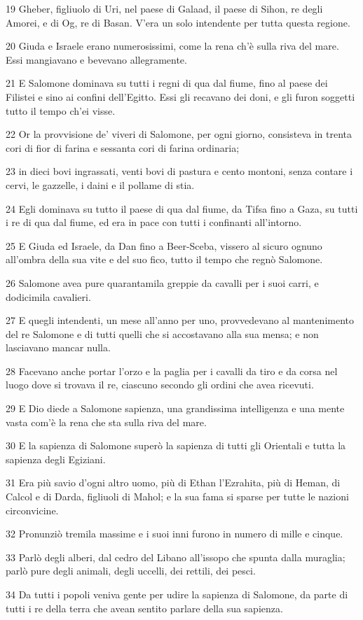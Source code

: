 \par 19 Gheber, figliuolo di Uri, nel paese di Galaad, il paese di Sihon, re degli Amorei, e di Og, re di Basan. V'era un solo intendente per tutta questa regione.
\par 20 Giuda e Israele erano numerosissimi, come la rena ch'è sulla riva del mare. Essi mangiavano e bevevano allegramente.
\par 21 E Salomone dominava su tutti i regni di qua dal fiume, fino al paese dei Filistei e sino ai confini dell'Egitto. Essi gli recavano dei doni, e gli furon soggetti tutto il tempo ch'ei visse.
\par 22 Or la provvisione de' viveri di Salomone, per ogni giorno, consisteva in trenta cori di fior di farina e sessanta cori di farina ordinaria;
\par 23 in dieci bovi ingrassati, venti bovi di pastura e cento montoni, senza contare i cervi, le gazzelle, i daini e il pollame di stia.
\par 24 Egli dominava su tutto il paese di qua dal fiume, da Tifsa fino a Gaza, su tutti i re di qua dal fiume, ed era in pace con tutti i confinanti all'intorno.
\par 25 E Giuda ed Israele, da Dan fino a Beer-Sceba, vissero al sicuro ognuno all'ombra della sua vite e del suo fico, tutto il tempo che regnò Salomone.
\par 26 Salomone avea pure quarantamila greppie da cavalli per i suoi carri, e dodicimila cavalieri.
\par 27 E quegli intendenti, un mese all'anno per uno, provvedevano al mantenimento del re Salomone e di tutti quelli che si accostavano alla sua mensa; e non lasciavano mancar nulla.
\par 28 Facevano anche portar l'orzo e la paglia per i cavalli da tiro e da corsa nel luogo dove si trovava il re, ciascuno secondo gli ordini che avea ricevuti.
\par 29 E Dio diede a Salomone sapienza, una grandissima intelligenza e una mente vasta com'è la rena che sta sulla riva del mare.
\par 30 E la sapienza di Salomone superò la sapienza di tutti gli Orientali e tutta la sapienza degli Egiziani.
\par 31 Era più savio d'ogni altro uomo, più di Ethan l'Ezrahita, più di Heman, di Calcol e di Darda, figliuoli di Mahol; e la sua fama si sparse per tutte le nazioni circonvicine.
\par 32 Pronunziò tremila massime e i suoi inni furono in numero di mille e cinque.
\par 33 Parlò degli alberi, dal cedro del Libano all'issopo che spunta dalla muraglia; parlò pure degli animali, degli uccelli, dei rettili, dei pesci.
\par 34 Da tutti i popoli veniva gente per udire la sapienza di Salomone, da parte di tutti i re della terra che avean sentito parlare della sua sapienza.


